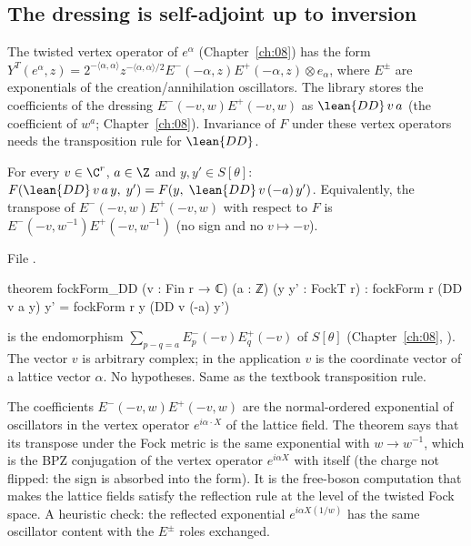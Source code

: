 \subsection{The dressing is self-adjoint up to inversion}

The twisted vertex operator of $e^\alpha$ (Chapter~\ref{ch:08}) has the form
$Y^T(e^\alpha,z)=2^{-\langle\alpha,\alpha\rangle}z^{-\langle\alpha,\alpha\rangle/2}E^-(-\alpha,z)E^+(-\alpha,z)\otimes e_\alpha$,
where $E^\pm$ are exponentials of the creation/annihilation oscillators. The library stores the
coefficients of the dressing $E^-(-v,w)E^+(-v,w)$ as $\lean{DD}\,v\,a$ (the coefficient of
$w^a$; Chapter~\ref{ch:08}). Invariance of $F$ under these vertex operators needs the
transposition rule for $\lean{DD}$.

\begin{theorem}\label{ch09:thm:DD}
For every $v\in\C^r$, $a\in\Z$ and $y,y'\in S[\theta]$:
$F(\lean{DD}\,v\,a\,y,\;y')=F(y,\;\lean{DD}\,v\,(-a)\,y')$. Equivalently, the transpose of
$E^-(-v,w)E^+(-v,w)$ with respect to $F$ is $E^-(-v,w^{-1})E^+(-v,w^{-1})$ (no sign and no
$v\mapsto-v$).
\end{theorem}
\noindent File .
\begin{leancode}
theorem fockForm_DD (v : Fin r → ℂ) (a : ℤ) (y y' : FockT r) :
    fockForm r (DD v a y) y' = fockForm r y (DD v (-a) y')
\end{leancode}
\begin{dictionary}
 is the endomorphism $\sum_{p-q=a}E^-_p(-v)E^+_q(-v)$ of $S[\theta]$ (Chapter~\ref{ch:08},
). The vector $v$ is
arbitrary complex; in the application $v$ is the coordinate vector of a lattice vector $\alpha$.
No hypotheses. Same as the textbook transposition rule.
\end{dictionary}
\begin{physics}
The coefficients $E^-(-v,w)E^+(-v,w)$ are the normal-ordered exponential of oscillators in the vertex operator $e^{i\alpha\cdot X}$ of the lattice field. The theorem says that its transpose under the Fock metric is the same exponential with $w\to w^{-1}$, which is the BPZ conjugation of the vertex operator $e^{i\alpha X}$ with itself (the charge not flipped: the sign is absorbed into the form). It is the free-boson computation that makes the lattice fields satisfy the reflection rule at the level of the twisted Fock space. A heuristic check: the reflected exponential $e^{i\alpha X(1/w)}$ has the same oscillator content with the $E^\pm$ roles exchanged.
\end{physics}

